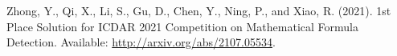  Zhong, Y., Qi, X., Li, S., Gu, D., Chen, Y., Ning, P., and Xiao, R. (2021). 1st Place Solution for ICDAR 2021 Competition on Mathematical Formula Detection.  Available: \url{http://arxiv.org/abs/2107.05534}.
